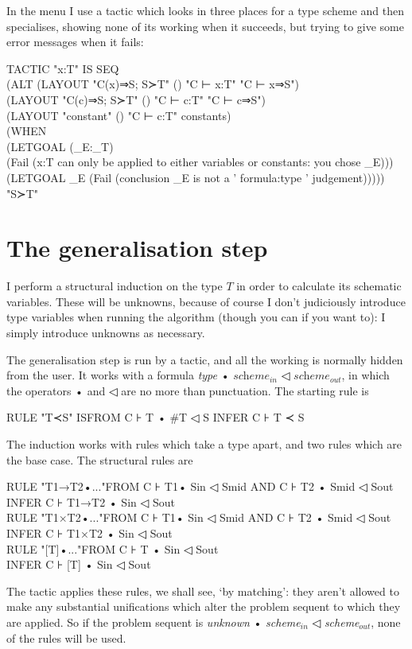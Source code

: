 In the menu I use a tactic which looks in three places for a type scheme and then specialises, showing none of its working when it succeeds, but trying to give some error messages when it fails:
\begin{japeish}
TACTIC "x:T" IS
\tab SEQ \\
\tab\tab(ALT (LAYOUT "C(x)⇒S; S≻T" () "C ⊢ x:T" "C ⊢ x⇒S")  \\
\tab\tab\tab(LAYOUT "C(c)⇒S; S≻T" ()  "C ⊢ c:T" "C ⊢ c⇒S") \\
\tab\tab\tab(LAYOUT "constant" () "C ⊢ c:T" constants) \\
\tab\tab\tab(WHEN \\
\tab\tab\tab\tab(LETGOAL (\_E:\_T) \\
\tab\tab\tab\tab\tab    (Fail (x:T can only be applied to either variables or constants: you chose \_E))) \\
\tab\tab\tab\tab(LETGOAL \_E (Fail (conclusion \_E is not a ' formula:type ' judgement)))))  \\
\tab\tab"S≻T"
\end{japeish}

\section{The generalisation step}

I perform a structural induction on the type $T$ in order to calculate its schematic variables. These will be unknowns, because of course I don't judiciously introduce type variables when running the algorithm (though you can if you want to): I simply introduce unknowns as necessary.

The generalisation step is run by a tactic, and all the working is normally hidden from the user. It works with a formula \textit{type} • $\textit{scheme}_{\textit{in}}$ ◁ $\textit{scheme}_{\textit{out}}$, in which the operators • and ◁ are no more than punctuation. The starting rule is
\begin{japeish}
RULE "T≺S" IS\tab FROM C ⊦ T • \#T ◁ S \tab INFER C ⊦ T ≺ S
\end{japeish}
The induction works with rules which take a type apart, and two rules which are the base case. The structural rules are
\begin{japeish}
RULE "T1→T2•..."\tab FROM C ⊦ T1• Sin ◁ Smid AND C ⊦ T2 • Smid ◁ Sout\\
\tab \tab INFER C ⊦ T1→T2 • Sin ◁ Sout\\
RULE "T1×T2•..."\tab FROM C ⊦ T1• Sin ◁ Smid AND C ⊦ T2 • Smid ◁ Sout\\
\tab \tab INFER C ⊦ T1×T2 • Sin ◁ Sout\\
RULE "[T]•..."\tab FROM C ⊦ T • Sin ◁ Sout\\
\tab \tab INFER C ⊦ [T] • Sin ◁ Sout
\end{japeish}
The tactic applies these rules, we shall see, `by matching': they aren't allowed to make any substantial unifications which alter the problem sequent to which they are applied. So if the problem sequent is \textit{unknown} • \textit{scheme}$_{\textit{in}}$ ◁ \textit{scheme}$_{\textit{out}}$, none of the rules will be used.

